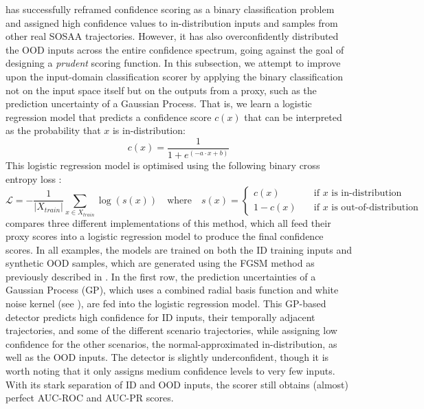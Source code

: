  has successfully reframed confidence scoring as a binary classification problem and assigned high confidence values to in-distribution inputs and samples from other real SOSAA trajectories. However, it has also overconfidently distributed the OOD inputs across the entire confidence spectrum, going against the goal of designing a \textit{prudent} scoring function. In this subsection, we attempt to improve upon the input-domain classification scorer by applying the binary classification not on the input space itself but on the outputs from a proxy, such as the prediction uncertainty of a Gaussian Process. That is, we learn a logistic regression model that predicts a confidence score $c(x)$ that can be interpreted as the probability that $x$ is in-distribution:
\begin{equation*}
    c(x) = \frac{1}{1 + e^{(-a \cdot x + b)}}
\end{equation*}
This logistic regression model is optimised using the following binary cross entropy loss \cite{statistical-learning-2009}:
\begin{equation*}
    \mathcal{L} = -\frac{1}{|X_{train}|} \sum_{x \in X_{train}}{\log(s(x))} \quad \text{where} \quad s(x) = \begin{cases}
        c(x) &\quad \text{if } x \text{ is in-distribution} \\
        1-c(x) &\quad \text{if } x \text{ is out-of-distribution}
    \end{cases}
\end{equation*}
\noindent {} compares three different implementations of this method, which all feed their proxy scores into a logistic regression model to produce the final confidence scores. In all examples, the models are trained on both the ID training inputs and synthetic OOD samples, which are generated using the FGSM method as previously described in . In the first row, the prediction uncertainties of a Gaussian Process (GP), which uses a combined radial basis function and white noise kernel (see ), are fed into the logistic regression model. This GP-based detector predicts high confidence for ID inputs, their temporally adjacent trajectories, and some of the different scenario trajectories, while assigning low confidence for the other scenarios, the normal-approximated in-distribution, as well as the OOD inputs. The detector is slightly underconfident, though it is worth noting that it only assigns medium confidence levels to very few inputs. With its stark separation of ID and OOD inputs, the scorer still obtains (almost) perfect AUC-ROC and AUC-PR scores.

